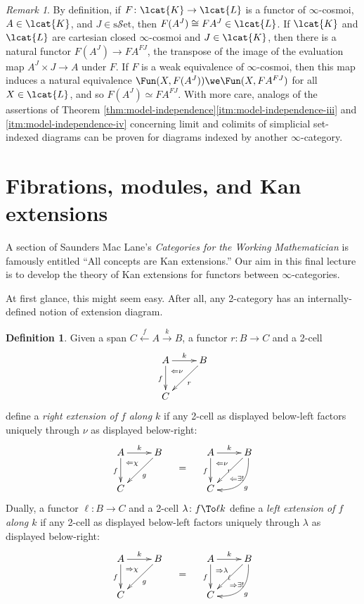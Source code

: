 \documentclass[12pt,reqno]{amsart}
\theoremstyle{plain}
\theoremstyle{definition}
\newtheorem{defn}[thm]{Definition}
\theoremstyle{remark}
\newtheorem{rmk}[thm]{Remark}
\numberwithin{equation}{subsection}
\renewcommand{\sSet}{\mathrm{s}\mathcal{S}\mathrm{et}}
\begin{document}
\begin{rmk} By definition, if $F \colon \lcat{K} \to \lcat{L}$ is a functor of $\infty$-cosmoi, $A \in \lcat{K}$, and $J \in \sSet$, then $F(A^J) \cong FA^J \in \lcat{L}$. If $\lcat{K}$ and $\lcat{L}$ are cartesian closed $\infty$-cosmoi and $J \in \lcat{K}$, then there is a natural functor $F(A^J) \to FA^{FJ}$, the transpose of the image of the evaluation map $A^J \times J \to A$ under $F$. If $F$ is a weak equivalence of $\infty$-cosmoi, then this map induces a natural equivalence $\Fun(X, F(A^J)) \we \Fun(X, FA^{FJ})$ for all $X\in\lcat{L}$, and so $F(A^J) \simeq FA^{FJ}$. With more care, analogs of the assertions of Theorem \ref{thm:model-independence}\ref{itm:model-independence-iii} and \ref{itm:model-independence-iv} concerning limit and colimits of simplicial set-indexed diagrams can be proven for diagrams indexed by another $\infty$-category.
\end{rmk}


\renewcommand\thesection{\bf Lecture~\arabic{section}}
\section{Fibrations, modules, and Kan extensions}\label{sec:modules}
\renewcommand\thesection{\arabic{section}}


A section of Saunders Mac Lane's \emph{Categories for the Working Mathematician}  is famously entitled ``All concepts are Kan extensions.'' Our aim in this final lecture is to develop the theory of Kan extensions for functors between $\infty$-categories.

At first glance, this might seem easy. After all, any 2-category has an internally-defined notion of extension diagram.

\begin{defn}\label{defn:right-ext} Given a span $C \xleftarrow{f} A \xrightarrow{k} B$, a functor $r \colon B \to C$ and a 2-cell 
\[ \xymatrix{ A \ar[r]^k \ar[d]_f & B \ar[dl]^r \\ C & \ar@{}[ul]|(.7){\Leftarrow\nu}}\]
define a \emph{right extension of $f$ along $k$} if any 2-cell as displayed below-left factors uniquely through $\nu$ as displayed below-right:
\[    \vcenter{\xymatrix{ A \ar[d]_f \ar[r]^k \ar@{}[dr]|(.3){\Leftarrow\chi} & B \ar[dl]^g \\ C  & }} \mkern20mu = \mkern20mu \vcenter{ \xymatrix{ A \ar[r]^k \ar[d]_f & B \ar[dl]|r \ar@/^4ex/[dl]^g \\ C & \ar@{}[ul]|(.3){\Leftarrow\exists!}|(.7){\Leftarrow\nu}}}
\] Dually, a functor $\ell \colon B \to C$ and a 2-cell $\lambda \colon f \To \ell k$ define a \emph{left extension of $f$ along $k$} if any 2-cell as displayed below-left factors uniquely through $\lambda$ as displayed below-right:
\[    \vcenter{\xymatrix{ A \ar[d]_f \ar[r]^k \ar@{}[dr]|(.3){\Rightarrow\chi} & B \ar[dl]^g \\ C  & }} \mkern20mu = \mkern20mu \vcenter{ \xymatrix{ A \ar[r]^k \ar[d]_f & B \ar[dl]|\ell \ar@/^4ex/[dl]^g \\ C & \ar@{}[ul]|(.3){\Rightarrow\exists!}|(.7){\Rightarrow\lambda}}}
\] 
\end{defn}
\end{document}

